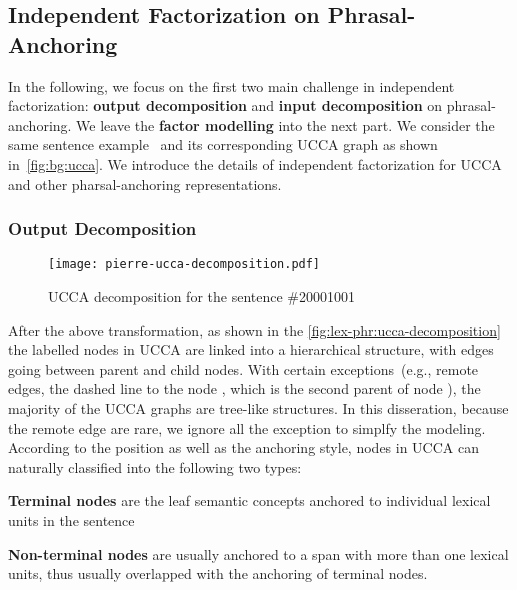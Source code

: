 \subsection{Independent Factorization on Phrasal-Anchoring}
\label{ssec:lex-phr:phr-factorization-analysis}
In the following, we focus on the first two main challenge in
independent factorization: \textbf{output decomposition} and
\textbf{input decomposition} on phrasal-anchoring. We leave the
\textbf{factor modelling} into the next part. We consider the same
sentence example~ and its corresponding UCCA graph as
shown in~\autoref{fig:bg:ucca}. We introduce the details of
independent factorization for UCCA and other pharsal-anchoring
representations.

\subsubsection{Output Decomposition}
\label{sssec:lex-phr:phr-output-decomposition}
\begin{figure}[!tbp]
  \centering
  \texttt{[image: pierre-ucca-decomposition.pdf]}
  \caption{\label{fig:lex-phr:ucca-decomposition} UCCA decomposition
    for the sentence \#20001001}
\end{figure}

After the above transformation, as shown in the
\autoref{fig:lex-phr:ucca-decomposition} the labelled nodes in UCCA
are linked into a hierarchical structure, with edges going between
parent and child nodes. With certain exceptions~(e.g., remote edges,
the dashed line to the node , which is the second parent of node
), the majority of the UCCA graphs are tree-like
structures. In this disseration, because the remote edge are rare, we
ignore all the exception to simplfy the modeling. According to the
position as well as the anchoring style, nodes in UCCA can naturally
classified into the following two types:

\begin{inparaenum}
\item \textbf{Terminal nodes} are the leaf semantic
  concepts anchored to individual lexical units in the sentence

\item \textbf{Non-terminal nodes} are usually anchored to a span with
  more than one lexical units, thus usually overlapped with the
  anchoring of terminal nodes.
\end{inparaenum}

